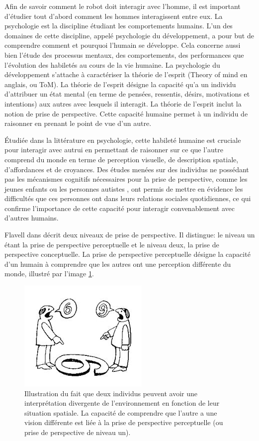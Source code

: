 \documentclass[a4paper,11pt,twoside]{StyleThese}
\begin{document}
Afin de savoir comment le robot doit interagir avec l'homme, il est important d'étudier tout d'abord comment les hommes interagissent entre eux.
La psychologie est la discipline étudiant les comportements humains.
L'un des domaines de cette discipline, appelé psychologie du développement, a pour but de comprendre comment et pourquoi l'humain se développe. Cela concerne aussi bien l'étude des processus mentaux, des comportements, des performances que l'évolution des habiletés au cours de la vie humaine.
La psychologie du développement s'attache à caractériser la théorie de l'esprit (Theory of mind en anglais, ou ToM). La théorie de l'esprit désigne la capacité qu'a un individu d'attribuer un état mental (en terme de pensées, ressentis, désirs, motivations et intentions) aux autres avec lesquels il interagit. La théorie de l'esprit inclut la notion de prise de perspective. Cette capacité humaine permet à un individu de raisonner en prenant le point de vue d'un autre.

Étudiée dans la littérature en psychologie\cite{Flavell1992,Tversky1999}, cette habileté humaine est cruciale pour interagir avec autrui en permettant de raisonner sur ce que l'autre comprend du monde en terme de perception visuelle, de description spatiale, d'affordances et de croyances.
Des études menées sur des individus ne possédant pas les mécanismes cognitifs nécessaires pour la prise de perspective, comme les jeunes enfants ou les personnes autistes \cite{frick2014picturing}, ont permis de mettre en évidence les difficultés que ces personnes ont dans leurs relations sociales quotidiennes, ce qui confirme l'importance de cette capacité pour interagir convenablement avec d'autres humains.

Flavell dans \cite{flavell1977development} décrit deux niveaux de prise de perspective. Il distingue: le niveau un étant la prise de perspective perceptuelle et le niveau deux, la prise de perspective conceptuelle.
La prise de perspective perceptuelle désigne la capacité d'un humain à comprendre que les autres ont une perception différente du monde, illustré par l'image \ref{fig:perceptuel}.

\begin{figure}[ht!]
 \centering
  \includegraphics[width=0.49\linewidth]{./img/perceptuel.jpg} 
  \caption {Illustration du fait que deux individus peuvent avoir une interprétation divergente de l'environnement en fonction de leur situation spatiale. La capacité de comprendre que l'autre a une vision différente est liée à la prise de perspective perceptuelle (ou prise de perspective de niveau un).}
  \label{fig:perceptuel}
\end{figure}
\end{document}
